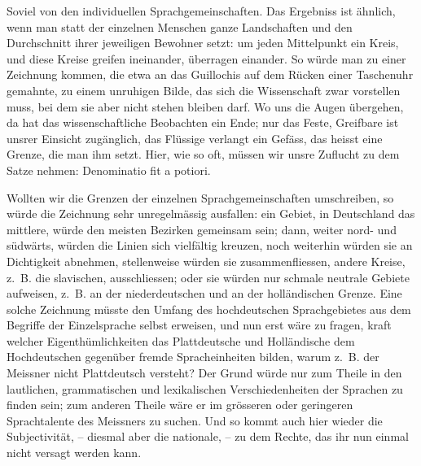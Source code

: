 Soviel von den individuellen Sprachgemeinschaften. Das Ergebniss ist ähnlich, wenn man statt der einzelnen Menschen ganze Landschaften \label{fp.57} und den Durchschnitt ihrer jeweiligen Bewohner setzt: um jeden Mittelpunkt ein Kreis, und diese Kreise greifen ineinander, überragen einander. So würde man zu einer Zeichnung kommen, die etwa an das Guillochis auf dem Rücken einer Taschenuhr gemahnte, zu einem unruhigen Bilde, das sich die Wissenschaft zwar vorstellen muss, bei dem sie aber nicht stehen bleiben darf. Wo uns die Augen übergehen, da hat das wissenschaftliche Beobachten ein Ende; nur das Feste, Greifbare ist unsrer Einsicht zugänglich, das Flüssige verlangt ein Gefäss, das heisst eine Grenze, die man ihm setzt. Hier, wie so oft, müssen wir unsre Zuflucht zu dem Satze nehmen: Denominatio fit a potiori.

Wollten wir die Grenzen der einzelnen Sprachgemeinschaften umschreiben, so würde die Zeichnung sehr unregelmässig ausfallen: ein Gebiet, in Deutschland das mittlere, würde den meisten Bezirken gemeinsam sein; dann, weiter nord- und südwärts, würden die Linien sich vielfältig kreuzen, noch weiterhin würden sie an Dichtigkeit abnehmen, stellenweise würden sie zusammenfliessen, andere Kreise, z.~B. die slavischen, ausschliessen; oder sie würden nur schmale neutrale Gebiete aufweisen, z.~B. an der niederdeutschen und an der holländischen Grenze. Eine solche Zeichnung müsste den Umfang des hochdeutschen Sprachgebietes aus \label{sp.57} dem Begriffe der Einzelsprache selbst erweisen, und nun erst wäre zu fragen, kraft welcher Eigenthümlichkeiten das Plattdeutsche und Holländische dem Hochdeutschen gegenüber fremde Spracheinheiten bilden, warum z.~B. der Meissner nicht Plattdeutsch versteht? Der Grund würde nur zum Theile in den lautlichen, grammatischen und lexikalischen Verschiedenheiten der Sprachen zu finden sein; zum anderen Theile wäre er im grösseren oder geringeren Sprachtalente des Meissners zu suchen. Und so kommt auch hier wieder die Subjectivität, – diesmal aber die nationale, – zu dem Rechte, das ihr nun einmal nicht versagt werden kann.

